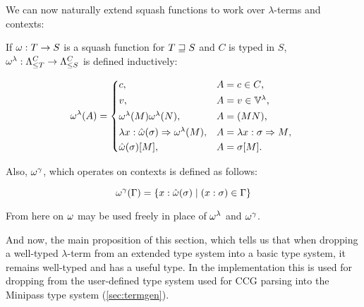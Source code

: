 \documentclass[main.tex]{subfiles}
\begin{document}
We can now naturally extend squash functions to work over $\lambda$-terms
and contexts:
\begin{defn}
    If $\squash: T \fun S$ is a squash function for $T \tless S$ and
    $C$ is typed in $S$,
    $\lsquash: \fancylambda{T}{C} \fun \fancylambda{S}{C}$
    is defined inductively:

    \[
        \lsquash(A) =
        \begin{cases*}
            c ,& $A = c \in C$, \\
            v ,& $A = v \in \lvars$, \\
            \lsquash(M) \lsquash(N) ,& $A = (MN)$, \\
            \lambda x : \tsquash(\sigma) \abstr \lsquash(M)
 ,& $A = \lambda x : \sigma \abstr M$, \\
                \tsquash(\sigma)[M] ,& $A = \sigma[M]$. \\
        \end{cases*}
    \]

    Also,
    $\consquash$, which operates on contexts
    is defined as follows:

    \[
        \consquash(\Gamma)
            = \{ x : \tsquash(\sigma) \mid (x : \sigma) \in \Gamma \}
    \]
\end{defn}

From here on $\squash$ may be used freely in place of $\lsquash$
and $\consquash$.

And now, the main proposition of this section, which tells us that when
dropping a well-typed $\lambda$-term from an extended type system into
a basic type system, it remains well-typed and has a useful type.
In the implementation this is used for dropping from the user-defined
type system used for CCG parsing into the Minipass type system
(\cref{sec:termgen}).
\end{document}
